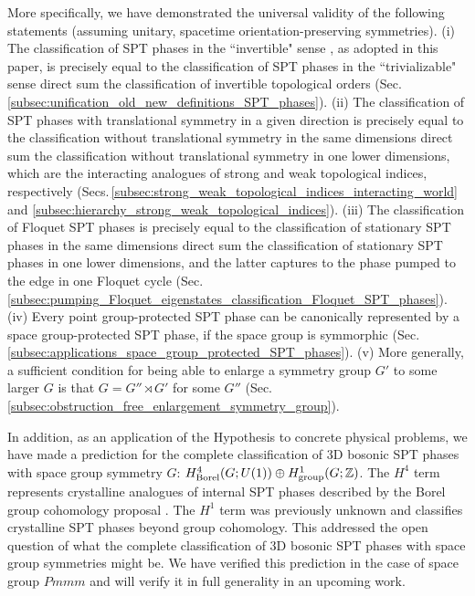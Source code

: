 \documentclass[sort&compress]{elsarticle}
\theoremstyle{theoremstyle}
\theoremstyle{framedtheoremstyle}
\theoremstyle{definitionstyle}
\theoremstyle{definitionstyle}
\theoremstyle{definitionstyle}
\theoremstyle{definitionstyle}
\theoremstyle{nameddefinitionstyle}
\theoremstyle{framednameddefinitionstyle}
\theoremstyle{proofstyle}
\theoremstyle{definitionstyle}
\newcommand{\ZZZ}{\mathbb{Z}}
\begin{document}
More specifically, we have demonstrated the universal validity of the following statements (assuming unitary, spacetime orientation-preserving symmetries). (i) The classification of SPT phases in the ``invertible" sense \cite{FreedMoore2006, Kitaev_Stony_Brook_2011_SRE_2, Kitaev_Stony_Brook_2013_SRE, Kapustin_Boson, Freed_SRE_iTQFT, Freed_ReflectionPositivity, McGreevy_sSourcery}, as adopted in this paper, is precisely equal to the classification of SPT phases in the ``trivializable" sense \cite{Wen_Definition, Cirac} direct sum the classification of invertible topological orders (Sec.\,\ref{subsec:unification_old_new_definitions_SPT_phases}). (ii) The classification of SPT phases with translational symmetry in a given direction is precisely equal to the classification without translational symmetry in the same dimensions direct sum the classification without translational symmetry in one lower dimensions, which are the interacting analogues of strong and weak topological indices, respectively (Secs.\,\ref{subsec:strong_weak_topological_indices_interacting_world} and \ref{subsec:hierarchy_strong_weak_topological_indices}). (iii) The classification of Floquet SPT phases is precisely equal to the classification of stationary SPT phases in the same dimensions direct sum the classification of stationary SPT phases in one lower dimensions, and the latter captures to the phase pumped to the edge in one Floquet cycle (Sec.\,\ref{subsec:pumping_Floquet_eigenstates_classification_Floquet_SPT_phases}). (iv) Every point group-protected SPT phase can be canonically represented by a space group-protected SPT phase, if the space group is symmorphic (Sec.\,\ref{subsec:applications_space_group_protected_SPT_phases}). (v) More generally, a sufficient condition for being able to enlarge a symmetry group $G'$ to some larger $G$ is that $G = G'' \rtimes G'$ for some $G''$ (Sec.\,\ref{subsec:obstruction_free_enlargement_symmetry_group}).

In addition, as an application of the Hypothesis to concrete physical problems, we have made a prediction for the complete classification of 3D bosonic SPT phases with space group symmetry $G$: $H^4_{\rm Borel}(G;U(1)) \oplus H^1_{\rm group}(G;\ZZZ)$. The $H^4$ term represents crystalline analogues of internal SPT phases described by the Borel group cohomology proposal \cite{Wen_Boson}. The $H^1$ term was previously unknown and classifies crystalline SPT phases beyond group cohomology. This addressed the open question of what the complete classification of 3D bosonic SPT phases with space group symmetries might be. We have verified this prediction in the case of space group $Pmmm$ and will verify it in full generality in an upcoming work.
\end{document}

